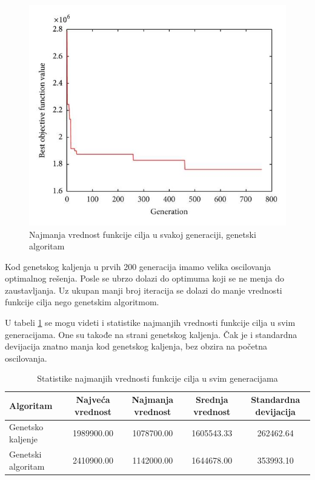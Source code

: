 \documentclass[a4paper]{article}
\begin{document}
\newpage
\begin{figure}[h!]
\centering
\includegraphics[scale= 0.4]{LIRP_Grafik_Genetski_Algoritam}
\caption{Najmanja vrednost funkcije cilja u svakoj generaciji, genetski algoritam}

\label{fig:4}
\end{figure}

Kod genetskog kaljenja u prvih 200 generacija imamo velika oscilovanja optimalnog rešenja. Posle se ubrzo dolazi do optimuma koji se ne menja do zaustavljanja. Uz ukupan manji broj iteracija se dolazi do manje vrednosti funkcije cilja nego genetskim algoritmom.

U tabeli \ref{tabela:2} se mogu videti i statistike najmanjih vrednosti funkcije cilja u svim generacijama. One su takođe na strani genetskog kaljenja. Čak je i standardna devijacija znatno manja kod genetskog kaljenja, bez obzira na početna oscilovanja.

\begin{table}[ht]
\begin{center}
\begin{tabular}{|l|c|c|c|c|} \hline
     Algoritam & Najveća vrednost & Najmanja vrednost & Srednja vrednost & Standardna devijacija \\ \hline
     Genetsko kaljenje &  1989900.00 & 1078700.00 & 1605543.33	& 262462.64 \\ \hline
     Genetski algoritam & 2410900.00 & 1142000.00 & 1644678.00 & 353993.10 \\ \hline
\end{tabular}
\end{center}
\label{tabela:2}
\caption{Statistike najmanjih vrednosti funkcije cilja u svim generacijama}
\end{table}
\end{document}
